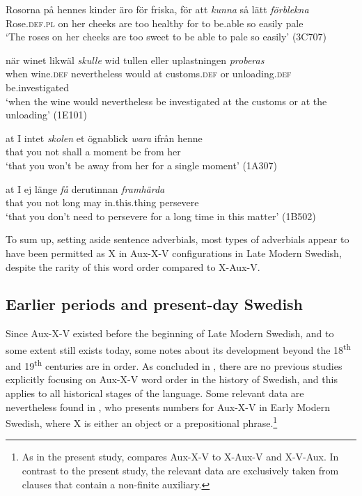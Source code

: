 \documentclass[output=paper, colorlinks, citecolor=brown]{langscibook}
\begin{document}
\ea
\label{ex:sangfelt:26}
\ea \label{ex:sangfelt:26a}
\gll Rosorna på hennes kinder äro för friska, för att \textit{kunna} {så} {lätt} \textit{förblekna}\\ %
 Rose.\textsc{def.pl} on her cheeks are too healthy for to be.able so easily pale\\
\glt ‘The roses on her cheeks are too sweet to be able to pale so easily’ (3C707)

\ex\label{ex:sangfelt:26b}
\gll när winet likwäl \textit{skulle} {wid} {tullen} {eller} {uplastningen} \textit{proberas}\\
 when wine.\textsc{def} nevertheless would at customs.\textsc{def} or unloading.\textsc{def} be.investigated\\
\glt ‘when the wine would nevertheless be investigated at the customs or at the unloading’ (1E101)

\ex\label{ex:sangfelt:26c}
\gll at I intet \textit{skolen} {et} {ögnablick} \textit{wara} ifrån henne \\
 that you not shall a moment be from her\\
\glt ‘that you won’t be away from her for a single moment’ (1A307)

\ex\label{ex:sangfelt:26d}
\gll at I ej länge \textit{få} {derutinnan} \textit{framhärda} \\
 that you not long may in.this.thing persevere\\
\glt ‘that you don’t need to persevere for a long time in this matter’ (1B502)
\z
\z 


 To sum up, setting aside sentence adverbials, most types of adverbials appear to have been permitted as X in Aux-X-V configurations in Late Modern Swedish, despite the rarity of this word order compared to X-Aux-V.

\subsection{Earlier periods and present-day Swedish}\label{sec:sangfelt:4.3}

 Since Aux-X-V existed before the beginning of Late Modern Swedish, and to some extent still exists today, some notes about its development beyond the 18\textsuperscript{th} and 19\textsuperscript{th} centuries are in order. As concluded in , there are no previous studies explicitly focusing on Aux-X-V word order in the history of Swedish, and this applies to all historical stages of the language. Some relevant data are nevertheless found in \citet{Sangfelt2019}, who presents numbers for Aux-X-V in Early Modern Swedish, where X is either an object or a prepositional phrase.\footnote{As in the present study, \citet{Sangfelt2019} compares Aux-X-V to X-Aux-V and X-V-Aux. In contrast to the present study, the relevant data are exclusively taken from clauses that contain a non-finite auxiliary.}
\end{document}
